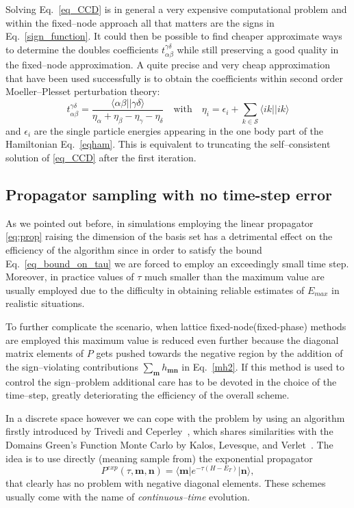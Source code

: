 Solving Eq.~\eqref{eq_CCD} is in general a very expensive computational problem and within 
the fixed--node approach all that matters are the signs in Eq.~\eqref{sign_function}. It could 
then be possible to find cheaper approximate ways to determine the doubles coefficients $t_{\alpha\beta}^{\gamma\delta}$ 
while still preserving a good quality in the fixed--node approximation. A quite precise and very
cheap approximation that have been used successfully is to obtain the coefficients within second 
order Moeller--Plesset perturbation theory:
\begin{equation}
t_{\alpha\beta}^{\gamma\delta} = \frac{\langle \alpha\beta\lvert\rvert \gamma\delta\rangle }{\eta_\alpha+\eta_\beta-\eta_\gamma-\eta_\delta} \quad  \text{with} \quad \eta_i=\epsilon_i+\sum_{k\in\mathcal{S}} \langle ik\lvert\rvert ik\rangle
\end{equation}
and $\epsilon_i$ are the single particle energies appearing in the one body part of the Hamiltonian Eq.~\eqref{eqham}.
This is equivalent to truncating the self--consistent solution of \eqref{eq_CCD} after the first iteration.

\subsection{Propagator sampling with no time-step error}
\label{sec:expprop}
As we pointed out before, in simulations employing the linear propagator \eqref{eq:prop} raising the dimension of the basis set has a detrimental effect on the efficiency 
of the algorithm since in order to satisfy the bound Eq.~\eqref{eq_bound_on_tau} we are forced to employ
an exceedingly small time step. Moreover, in practice values of $\tau$ much smaller than the
maximum value are usually employed due to the difficulty in obtaining reliable estimates of $E_{max}$ in realistic situations.

To further complicate the scenario, when lattice fixed-node(fixed-phase) methods are employed this maximum value is reduced even further because the diagonal
matrix elements of $P$ gets pushed towards the negative region by the addition of the sign--violating contributions $\sum_{\mathbf{m}} h_{\mathbf{m}\mathbf{n}}$ in Eq.~\eqref{mh2}. 
If this method is used to control the sign--problem additional care has to be devoted in the choice of the time--step, greatly deteriorating the efficiency of the overall scheme.

In a discrete space however we can cope with the problem by using an algorithm firstly introduced by Trivedi and Ceperley~\cite{Trivedi90}, which shares 
similarities with the Domains Green's Function Monte Carlo by Kalos, Levesque, and Verlet~\cite{Kalos74}. The idea is to use directly (meaning sample from) the exponential propagator
\begin{equation}
\label{exp_prop}
P^{exp}(\tau,\mathbf{m},\mathbf{n}) = \langle \mathbf{m} \lvert e^{-\tau(H - E_T)} \rvert \mathbf{n}  \rangle,
\end{equation}
that clearly has no problem with negative diagonal elements. These schemes usually come with the name of {\it continuous--time} evolution.

